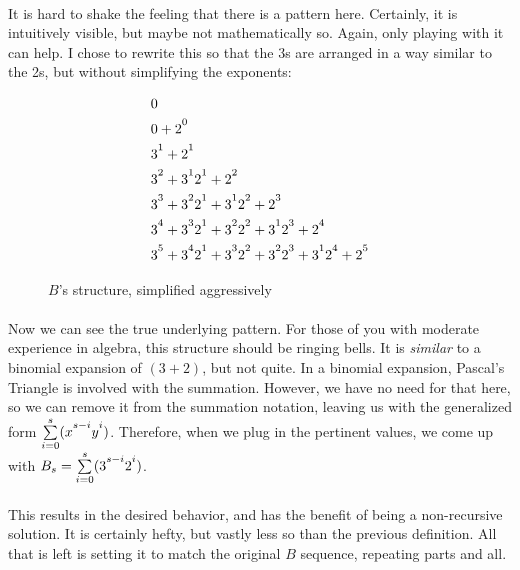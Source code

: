 \documentclass[12pt,letterpaper]{article}
\begin{document}
			\paragraph{} It is hard to shake the feeling that there is a pattern here. Certainly, it is intuitively visible, but maybe not mathematically so. Again, only playing with it can help. I chose to rewrite this so that the 3s are arranged in a way similar to the 2s, but without simplifying the exponents:
			
			\begin{figure}[h]
				\begin{align*}
					&0\\
					&0 + 2\strut^0\\
					&3\strut^1 + 2\strut^1\\
					&3\strut^2 + 3\strut^1 2\strut^1 + 2\strut^2\\
					&3\strut^3 + 3\strut^2 2\strut^1 + 3\strut^1 2\strut^2 + 2\strut^3\\
					&3\strut^4 + 3\strut^3 2\strut^1 + 3\strut^2 2\strut^2+ 3\strut^1 2\strut^3 + 2\strut^4\\
					&3\strut^5 + 3\strut^4 2\strut^1 + 3\strut^3 2\strut^2+ 3\strut^2 2\strut^3 + 3\strut^1 2\strut^4 + 2\strut^5
				\end{align*}
				
				\caption{$B$'s structure, simplified aggressively}
				\label{fig:bAggressive}
			\end{figure}
		
			\paragraph{} Now we can see the true underlying pattern. For those of you with moderate experience in algebra, this structure should be ringing bells. It is \textit{similar} to a binomial expansion of $(3 + 2)$, but not quite. In a binomial expansion, Pascal's Triangle is involved with the summation. However, we have no need for that here, so we can remove it from the summation notation, leaving us with the generalized form $\sum\limits_{i = 0}^s (x\strut^{s-i}y\strut^i)$. Therefore, when we plug in the pertinent values, we come up with $B_s = \sum\limits_{i = 0}^s (3\strut^{s-i}2\strut^i)$.
			
			\paragraph{} This results in the desired behavior, and has the benefit of being a non-recursive solution. It is certainly hefty, but vastly less so than the previous definition. All that is left is setting it to match the original $B$ sequence, repeating parts and all.
			
\end{document}
